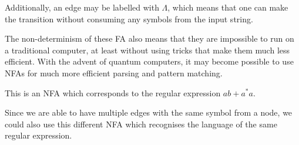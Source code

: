 Additionally, an edge may be labelled with $\Lambda$, which means that one can make the transition without consuming any
 symbols from the input string.

The non-determinism of these FA also means that they are impossible to run on a traditional computer, at least without
 using tricks that make them much less efficient. With the advent of quantum computers, it may become possible to use
 NFAs for much more efficient parsing and pattern matching.

\begin{example*}{}{}
  \centering

  This is an NFA which corresponds to the regular expression $ab + a^*a$.
\end{example*}

Since we are able to have multiple edges with the same symbol from a node, we could also use this different NFA which
 recognises the language of the same regular expression.

\begin{example*}{}{}
  \centering
\end{example*}

